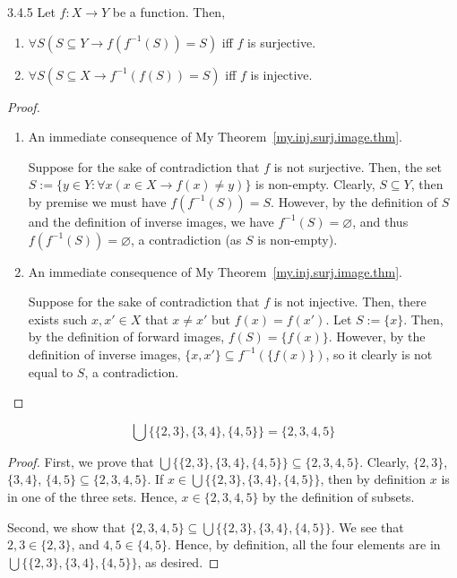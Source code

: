 \begin{exercise}{3.4.5}
	Let $f: X \to Y$ be a function. Then,
	\begin{enumerate}
		\item $\forall S(S \subseteq Y \to f(f^{-1}(S)) = S)$ iff $f$ is surjective.
		\item $\forall S(S \subseteq X \to f^{-1}(f(S)) = S)$ iff $f$ is injective.
	\end{enumerate}
\end{exercise}
\begin{proof}\leavevmode
	\begin{enumerate}
		\item {} An immediate consequence of My Theorem~\ref{my.inj.surj.image.thm}.
		
		 Suppose for the sake of contradiction that $f$ is not surjective. Then, the set 
		$S := \{y \in Y: \forall x(x \in X \to f(x) \ne y)\}$ is non-empty. Clearly, $S \subseteq Y$, then by premise we must have $f(f^{-1}(S)) = S$. However, by the definition of $S$ and the definition of inverse images, we have $f^{-1}(S) = \varnothing$, and thus $f(f^{-1}(S)) = \varnothing$, a contradiction (as $S$ is non-empty).
		
		\item {} An immediate consequence of My Theorem~\ref{my.inj.surj.image.thm}.
		
		 Suppose for the sake of contradiction that $f$ is not injective. Then, there exists such $x,x' \in X$ that $x \ne x'$ but $f(x) = f(x')$. Let $S := \{x\}$. Then, by the definition of forward images, $f(S) = \{f(x)\}$. However, by the definition of inverse images, $\{x,x'\} \subseteq f^{-1}(\{f(x)\})$, so it clearly is not equal to $S$, a contradiction.
	\end{enumerate}
\end{proof}

\begin{why}{50}
	\[
		\bigcup \{\{2,3\},\{3,4\},\{4,5\}\} = \{2,3,4,5\}
	\]
\end{why}
\begin{proof}
	First, we prove that $\bigcup \{\{2,3\},\{3,4\},\{4,5\}\} \subseteq \{2,3,4,5\}$. Clearly, $\{2,3\}$, $\{3,4\}$, $\{4,5\} \subseteq \{2,3,4,5\}$. If $x \in \bigcup \{\{2,3\},\{3,4\},\{4,5\}\}$, then by definition $x$ is in one of the three sets. Hence, $x \in \{2,3,4,5\}$ by the definition of subsets.
	
	Second, we show that $\{2,3,4,5\} \subseteq \bigcup \{\{2,3\},\{3,4\},\{4,5\}\}$. We see that $2,3 \in \{2,3\}$, and $4,5 \in \{4,5\}$. Hence, by definition, all the four elements are in $\bigcup \{\{2,3\},\{3,4\},\{4,5\}\}$, as desired.
\end{proof}

